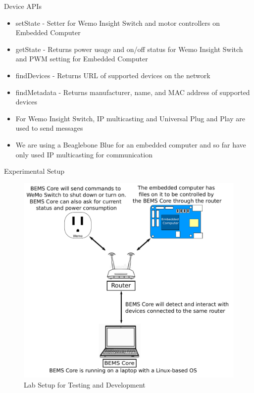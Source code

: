\documentclass{beamer}
\begin{document}
\begin{frame}{Device APIs}
    \begin{itemize}
        \item setState - Setter for Wemo Insight Switch and motor controllers on Embedded Computer
        \item getState - Returns power usage and on/off status for Wemo Insight Switch and PWM setting for Embedded Computer
        \item findDevices - Returns URL of supported devices on the network
        \item findMetadata - Returns manufacturer, name, and MAC address of supported devices
        \item For Wemo Insight Switch, IP multicasting and Universal Plug and Play are used to send messages
        \item We are using a Beaglebone Blue for an embedded computer and so far have only used IP multicasting for communication
    \end{itemize}
\end{frame}

\begin{frame}{Experimental Setup}
    \begin{figure}
        \centering
        \includegraphics[scale=0.3]{figs/experimentalSetup.pdf}
        \caption{Lab Setup for Testing and Development}
        \label{fig:my_label}
    \end{figure}
\end{frame}
\end{document}
